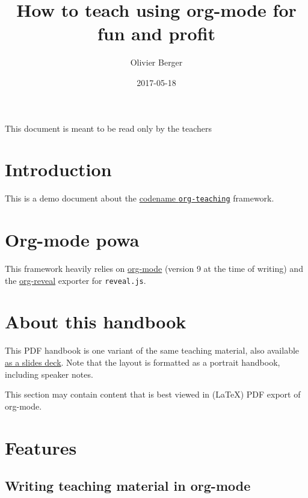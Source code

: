 \documentclass[a4paper]{article}
\author{Olivier Berger}
\date{2017-05-18}
\title{How to teach using org-mode for fun and profit}
\begin{document}
\maketitle
\setcounter{tocdepth}{2}
\tableofcontents

\begin{ABSTRACT}
\begin{shaded}
This document is meant to be read only by the teachers
\end{shaded}
\end{ABSTRACT}



\section{Introduction}
\label{sec:orged75a07}

This is a demo document about the
\href{http://www-public.tem-tsp.eu/\~berger\_o/org-teaching/}{codename \texttt{org-teaching}} framework.

\section{Org-mode powa}
\label{sec:org797c069}

This framework heavily relies on \href{http://orgmode.org/}{org-mode} (version 9 at the time of writing) and the \href{https://github.com/yjwen/org-reveal/}{org-reveal} exporter for \texttt{reveal.js}.

\section{About this handbook}
\label{sec:org5420f65}

This PDF handbook is one variant of the same teaching material, also
available \href{./slides.html}{as a slides deck}. Note that the layout is
formatted as a portrait handbook, including speaker notes.

This section may contain content that is best viewed in (\LaTeX{}) PDF export of org-mode.

\section{Features}
\label{sec:orga32f93f}
\subsection{Writing teaching material in org-mode}
\label{sec:org67074e6}
\end{document}
